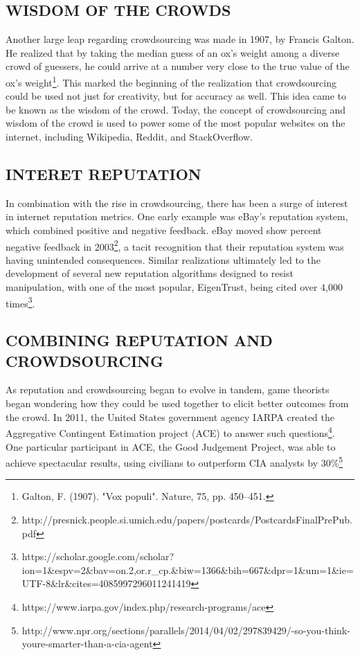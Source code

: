 \subsection{WISDOM OF THE CROWDS}\label{wisdom-of-the-crowds}

Another large leap regarding crowdsourcing was made in 1907, by Francis
Galton. He realized that by taking the median guess of an ox's weight
among a diverse crowd of guessers, he could arrive at a number very
close to the true value of the ox's weight\footnote{Galton, F. (1907).
  "Vox populi". Nature, 75, pp. 450--451.}. This marked the beginning of
the realization that crowdsourcing could be used not just for
creativity, but for accuracy as well. This idea came to be known as the
wisdom of the crowd. Today, the concept of crowdsourcing and wisdom of
the crowd is used to power some of the most popular websites on the
internet, including Wikipedia, Reddit, and StackOverflow.

\subsection{INTERET REPUTATION}\label{interet-reputation}

In combination with the rise in crowdsourcing, there has been a surge of
interest in internet reputation metrics. One early example was eBay's
reputation system, which combined positive and negative feedback. eBay
moved show percent negative feedback in 2003\footnote{http://presnick.people.si.umich.edu/papers/postcards/PostcardsFinalPrePub.pdf},
a tacit recognition that their reputation system was having unintended
consequences. Similar realizations ultimately led to the development of
several new reputation algorithms designed to resist manipulation, with
one of the most popular, EigenTrust, being cited over 4,000
times\footnote{https://scholar.google.com/scholar?ion=1\&espv=2\&bav=on.2,or.r\_cp.\&biw=1366\&bih=667\&dpr=1\&um=1\&ie=UTF-8\&lr\&cites=4085997296011241419}.

\subsection{COMBINING REPUTATION AND
CROWDSOURCING}\label{combining-reputation-and-crowdsourcing}

As reputation and crowdsourcing began to evolve in tandem, game
theorists began wondering how they could be used together to elicit
better outcomes from the crowd. In 2011, the United States government
agency IARPA created the Aggregative Contingent Estimation project (ACE)
to answer such questions\footnote{https://www.iarpa.gov/index.php/research-programs/ace}.
One particular participant in ACE, the Good Judgement Project, was able
to achieve spectacular results, using civilians to outperform CIA
analysts by 30\%\footnote{http://www.npr.org/sections/parallels/2014/04/02/297839429/-so-you-think-youre-smarter-than-a-cia-agent}

